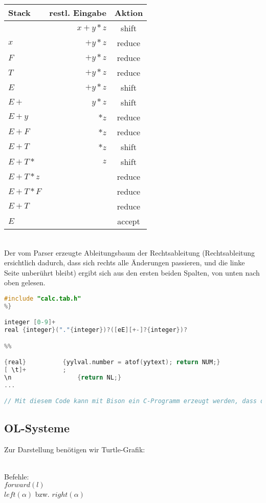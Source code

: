 \begin{tabular}{l r c}
Stack & restl. Eingabe &Aktion\\
\hline
& $x+y*z$ & shift\\
$x$ & $+y*z$ & reduce\\
$F$ & $+y*z$ & reduce\\
$T$ & $+y*z$ & reduce\\
$E$ & $+y*z$ & shift \\
$E+$ & $y*z$ & shift \\
$E+y$ & $*z$ & reduce\\
$E+F$ & $*z$ & reduce\\
$E+T$ & $*z$ & shift\footnotemark\\
$E+T*$ & $z$ & shift \\
$E+T*z$ & & reduce \\
$E+T*F$ & & reduce \\
$E+T$ & & reduce \\
$E$ & & accept
\end{tabular}
\\
Der vom Parser erzeugte Ableitungsbaum der Rechtsableitung (Rechtsableitung ersichtlich dadurch, dass sich rechts alle Änderungen passieren, und die linke Seite unberührt bleibt) ergibt sich aus den ersten beiden Spalten, von unten nach oben gelesen.
\begin{lstlisting}[language=C]
%{
#include "calc.tab.h"
%}

integer [0-9]+
real {integer}("."{integer})?([eE][+-]?{integer})?

%%

{real}			{yylval.number = atof(yytext); return NUM;}
[ \t]+			;
\n					{return NL;}
...

// Mit diesem Code kann mit Bison ein C-Programm erzeugt werden, dass diesen Parser implementiert
\end{lstlisting}


\subsection{OL-Systeme}
Zur Darstellung benötigen wir Turtle-Grafik:\\
\\
Befehle:\\
$forward (l)$ \\
$left (\alpha)$ bzw. $right(\alpha)$

